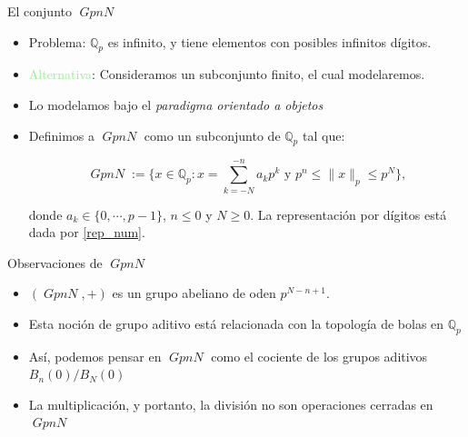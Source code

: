 \documentclass{beamer}
\theoremstyle{definition}
\numberwithin{equation}{section}
\newcommand{\tit}[1]{\textit{#1}}
\renewcommand{\geq}{\geqslant}
\renewcommand{\leq}{\leqslant}
\newcommand{\Qp}{\mathbb{Q}_p}
\newcommand{\pnorm}[1]{\|#1\|_p}
\DeclareMathOperator{\gpn}{\mathit{{GpnN}}}
\begin{document}
\begin{frame}{El conjunto $\gpn$}
	\begin{itemize}[<+- | alert@+>]
		\item \textcolor{orangeBar}{Problema}: $\Qp$ es infinito, y tiene elementos con posibles infinitos dígitos.
		\item \textcolor{lightGreen}{Alternativa}: Consideramos un subconjunto finito, el cual modelaremos.
		\item Lo modelamos bajo el \tit{paradigma orientado a objetos}
		\item Definimos a $\gpn$ como un subconjunto de $\Qp$ tal que:
		
		
		
		\begin{equation}\label{GpnN}
		\gpn := \Big\{x\in \Qp : x = \sum_{k=-N}^{-n} a_{k} p^{k} \text{ y } p^{n}\leq \pnorm{x}\leq p^N\Big \},
		\end{equation}
		
		donde $a_k\in \{0,\cdots,p-1\}$, $n\leq0$ y $N\geq 0$. La representación por dígitos está dada por \ref{rep_num}.
		
	\end{itemize}
\end{frame}

\begin{frame}{Observaciones de $\gpn$}
	\begin{itemize}[<+- | alert@+>]
		\item $   (\gpn,+)$ es un grupo abeliano de oden $p^{N-n+1}$.
		\item Esta noción de grupo aditivo está relacionada con la topología de bolas en $\Qp$
		\item Así, podemos pensar en $\gpn$ como el cociente de los grupos aditivos $B_n   (0)/B_N   (0)$
		\item  La  multiplicación, y portanto, la división no son operaciones cerradas en $\gpn$
	\end{itemize}
\end{frame}
\end{document}
